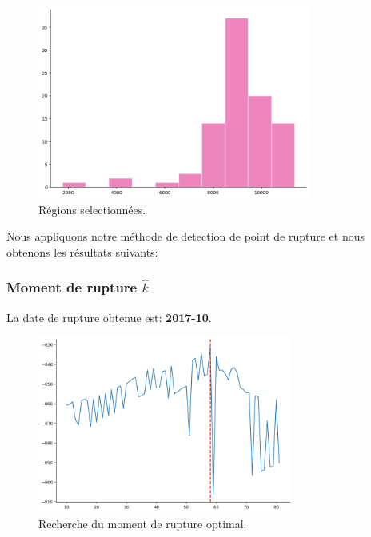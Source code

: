 {\begin{figure}[H]
\centering
\includegraphics[width=0.8\textwidth]{image/Cn-FIG02.png} 
\caption{Régions selectionnées.}
\label{fig:trains_programmes_2}
\end{figure}


Nous appliquons notre méthode de detection de point de rupture et nous obtenons les résultats suivants:

\subsubsection{Moment de rupture $\hat{k}$}

La date de rupture obtenue est: \textbf{2017-10}. 


\begin{figure}[H]
\centering
\includegraphics[width=0.75\textwidth]{image/Cn-FIG03.png} 
\caption{Recherche du moment de rupture optimal.}
\label{fig:trains_ANNULES_2}
\end{figure}


}
